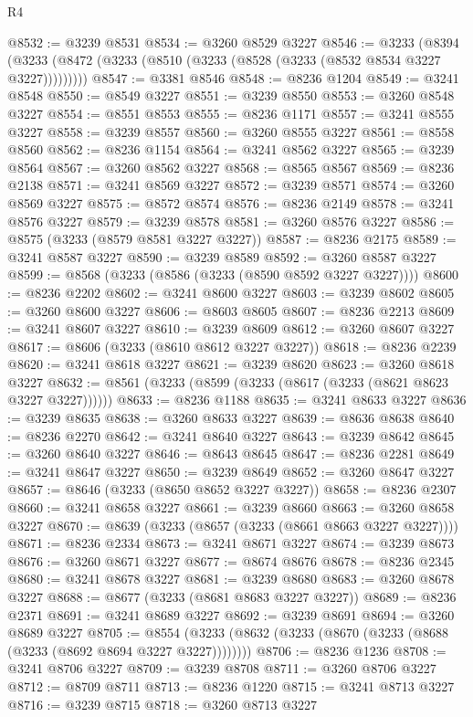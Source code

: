 \begin{lexlean}{R4}
\begin{coremodule}
@8532 := @3239 @8531
@8534 := @3260 @8529 @3227
@8546 := @3233
    (@8394 (@3233 (@8472 (@3233 (@8510 (@3233 (@8528 (@3233 (@8532 @8534 @3227 @3227)))))))))
@8547 := @3381 @8546
@8548 := @8236 @1204
@8549 := @3241 @8548
@8550 := @8549 @3227
@8551 := @3239 @8550
@8553 := @3260 @8548 @3227
@8554 := @8551 @8553
@8555 := @8236 @1171
@8557 := @3241 @8555 @3227
@8558 := @3239 @8557
@8560 := @3260 @8555 @3227
@8561 := @8558 @8560
@8562 := @8236 @1154
@8564 := @3241 @8562 @3227
@8565 := @3239 @8564
@8567 := @3260 @8562 @3227
@8568 := @8565 @8567
@8569 := @8236 @2138
@8571 := @3241 @8569 @3227
@8572 := @3239 @8571
@8574 := @3260 @8569 @3227
@8575 := @8572 @8574
@8576 := @8236 @2149
@8578 := @3241 @8576 @3227
@8579 := @3239 @8578
@8581 := @3260 @8576 @3227
@8586 := @8575 (@3233 (@8579 @8581 @3227 @3227))
@8587 := @8236 @2175
@8589 := @3241 @8587 @3227
@8590 := @3239 @8589
@8592 := @3260 @8587 @3227
@8599 := @8568 (@3233 (@8586 (@3233 (@8590 @8592 @3227 @3227))))
@8600 := @8236 @2202
@8602 := @3241 @8600 @3227
@8603 := @3239 @8602
@8605 := @3260 @8600 @3227
@8606 := @8603 @8605
@8607 := @8236 @2213
@8609 := @3241 @8607 @3227
@8610 := @3239 @8609
@8612 := @3260 @8607 @3227
@8617 := @8606 (@3233 (@8610 @8612 @3227 @3227))
@8618 := @8236 @2239
@8620 := @3241 @8618 @3227
@8621 := @3239 @8620
@8623 := @3260 @8618 @3227
@8632 := @8561 (@3233 (@8599 (@3233 (@8617 (@3233 (@8621 @8623 @3227 @3227))))))
@8633 := @8236 @1188
@8635 := @3241 @8633 @3227
@8636 := @3239 @8635
@8638 := @3260 @8633 @3227
@8639 := @8636 @8638
@8640 := @8236 @2270
@8642 := @3241 @8640 @3227
@8643 := @3239 @8642
@8645 := @3260 @8640 @3227
@8646 := @8643 @8645
@8647 := @8236 @2281
@8649 := @3241 @8647 @3227
@8650 := @3239 @8649
@8652 := @3260 @8647 @3227
@8657 := @8646 (@3233 (@8650 @8652 @3227 @3227))
@8658 := @8236 @2307
@8660 := @3241 @8658 @3227
@8661 := @3239 @8660
@8663 := @3260 @8658 @3227
@8670 := @8639 (@3233 (@8657 (@3233 (@8661 @8663 @3227 @3227))))
@8671 := @8236 @2334
@8673 := @3241 @8671 @3227
@8674 := @3239 @8673
@8676 := @3260 @8671 @3227
@8677 := @8674 @8676
@8678 := @8236 @2345
@8680 := @3241 @8678 @3227
@8681 := @3239 @8680
@8683 := @3260 @8678 @3227
@8688 := @8677 (@3233 (@8681 @8683 @3227 @3227))
@8689 := @8236 @2371
@8691 := @3241 @8689 @3227
@8692 := @3239 @8691
@8694 := @3260 @8689 @3227
@8705 := @8554 (@3233 (@8632 (@3233 (@8670 (@3233 (@8688 (@3233 (@8692 @8694 @3227 @3227))))))))
@8706 := @8236 @1236
@8708 := @3241 @8706 @3227
@8709 := @3239 @8708
@8711 := @3260 @8706 @3227
@8712 := @8709 @8711
@8713 := @8236 @1220
@8715 := @3241 @8713 @3227
@8716 := @3239 @8715
@8718 := @3260 @8713 @3227

\end{coremodule}
\end{lexlean}

